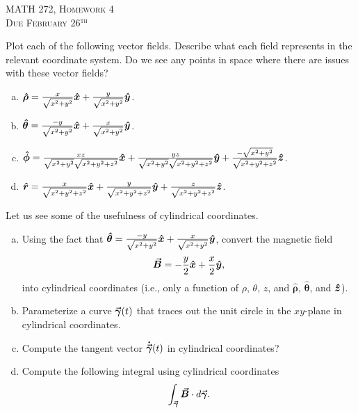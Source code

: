 \documentclass[12pt]{article} %
\newcommand{\grad}{\boldsymbol{\vec{\nabla}}}
\newcommand{\vecfieldB}{\boldsymbol{\vec{B}}}
\newcommand{\rhat}{\boldsymbol{\hat{r}}}
\newcommand{\thetahat}{\boldsymbol{\hat{\theta}}}
\newcommand{\phihat}{\boldsymbol{\hat{\phi}}}
\newcommand{\rhohat}{\boldsymbol{\hat{\rho}}}
\begin{document}
\begin{center}
   \textsc{\large MATH 272, Homework 4}\\
   \textsc{Due February 26$^\textrm{th}$}
\end{center}
\vspace{.5cm}

\begin{problem}
    Plot each of the following vector fields. Describe what each field represents in the relevant coordinate system. Do we see any points in space where there are issues with these vector fields?
    \begin{enumerate}[(a)]
        \item $\rhohat = \frac{x}{\sqrt{x^2+y^2}}\xhat + \frac{y}{\sqrt{x^2+y^2}}\yhat$.
        \item $\thetahat = \frac{-y}{\sqrt{x^2+y^2}}\xhat + \frac{x}{\sqrt{x^2+y^2}}\yhat$.
        \item $\phihat = \frac{xz}{\sqrt{x^2+y^2}\sqrt{x^2+y^2+z^2}}\xhat + \frac{yz}{\sqrt{x^2+y^2}\sqrt{x^2+y^2+z^2}}\yhat+\frac{-\sqrt{x^2+y^2}}{\sqrt{x^2+y^2+z^2}}\zhat$.
        \item $\rhat = \frac{x}{\sqrt{x^2+y^2+z^2}}\xhat + \frac{y}{\sqrt{x^2+y^2+z^2}}\yhat+\frac{z}{\sqrt{x^2+y^2+z^2}}\zhat$.
    \end{enumerate}
\end{problem}

\vspace*{.5cm}

\begin{problem}
Let us see some of the usefulness of cylindrical coordinates.
\begin{enumerate}[(a)]
    \item Using the fact that $\thetahat = \frac{-y}{\sqrt{x^2+y^2}}\xhat + \frac{x}{\sqrt{x^2+y^2}}\yhat$, convert the magnetic field 
    \[
    \vecfieldB = -\frac{y}{2}\xhat + \frac{x}{2}\yhat,
    \]
    into cylindrical coordinates (i.e., only a function of $\rho$, $\theta$, $z$, and $\rhohat$, $\thetahat$, and $\boldsymbol{\hat{z}}$).  
        \item Parameterize a curve $\boldsymbol{\vec{\gamma}}(t)$ that traces out the unit circle in the $xy$-plane in cylindrical coordinates.
        \item Compute the tangent vector $\boldsymbol{\dot{\vec{\gamma}}}(t)$ in cylindrical coordinates?
        \item Compute the following integral using cylindrical coordinates
        \[
        \int_{\curvegamma} \vecfieldB \cdot d\curvegamma.
        \]
\end{enumerate}
\end{problem}
\end{document}
